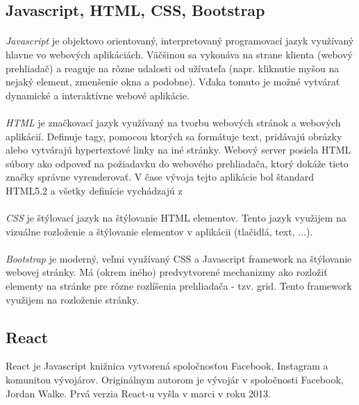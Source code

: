 \subsection{Javascript, HTML, CSS, Bootstrap}
\paragraph{}
\emph{Javascript} je objektovo orientovaný, interpretovaný programovací jazyk využívaný hlavne vo webových aplikáciách. Väčšinou sa vykonáva na strane klienta (webový prehliadač) a reaguje na rôzne udalosti od užívateľa (napr. kliknutie myšou na nejaký element, zmenšenie okna a podobne). Vďaka tomuto je možné vytvárať dynamické a interaktívne webové aplikácie.

\paragraph{}
\emph{HTML} je značkovací jazyk využívaný na tvorbu webových stránok a webových aplikácií. Definuje tagy, pomocou ktorých sa formátuje text, pridávajú obrázky alebo vytvárajú hypertextové linky na iné stránky. Webový server posiela HTML súbory ako odpoveď na požiadavku do webového prehliadača, ktorý dokáže tieto značky správne vyrenderovať. V čase vývoja tejto aplikácie bol štandard HTML5.2 a všetky definície vychádzajú z \cite{html}

\paragraph{}
\emph{CSS} je štýlovací jazyk na štýlovanie HTML elementov. Tento jazyk využijem na vizuálne rozloženie a štýlovanie elementov v aplikácii (tlačidlá, text, ...).

\paragraph{}
\emph{Bootstrap} je moderný, veľmi využívaný CSS a Javascript framework na štýlovanie webovej stránky. Má (okrem iného) predvytvorené mechanizmy ako rozložiť elementy na stránke pre rôzne rozlíšenia prehliadača - tzv. grid. Tento framework využijem na rozloženie stránky. 



\subsection{React}
React je Javascript knižnica vytvorená spoločnosťou Facebook, Instagram a komunitou vývojárov. Originálnym autorom je vývojár v spoločnosti Facebook, Jordan Walke. Prvá verzia React-u vyšla v marci v roku 2013. 
